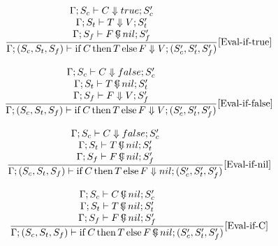 \documentclass{scrartcl}
\DeclareMathOperator{\ifop}{if}
\DeclareMathOperator{\thenop}{then}
\DeclareMathOperator{\elseop}{else}
\DeclareMathOperator{\ceval}{\overset{C}{\smash{\Downarrow}}}
\begin{document}
    \begin{align*}
    \frac{
        \begin{matrix}
        \Gamma; S_c \vdash C \Downarrow true; S_c' \\
        \Gamma; S_t \vdash T \Downarrow V; S_t' \\
        \Gamma; S_f \vdash F \ceval nil; S_f'
        \end{matrix}
    }{
        \Gamma; (S_c, S_t, S_f) \vdash \ifop C \thenop T \elseop F \Downarrow V; (S_c', S_t', S_f')
    }[\text{Eval-if-true}]
    \end{align*}
    
    \begin{align*}
    \frac{
        \begin{matrix}
        \Gamma; S_c \vdash C \Downarrow false; S_c' \\
        \Gamma; S_t \vdash T \ceval nil; S_t' \\
        \Gamma; S_f \vdash F \Downarrow V; S_f'
        \end{matrix}
    }{
        \Gamma; (S_c, S_t, S_f) \vdash \ifop C \thenop T \elseop F \Downarrow V; (S_c', S_t', S_f')
    }[\text{Eval-if-false}]
    \end{align*}
    
    \begin{align*}
    \frac{
        \begin{matrix}
        \Gamma; S_c \vdash C \Downarrow false; S_c' \\
        \Gamma; S_t \vdash T \ceval nil; S_t' \\
        \Gamma; S_f \vdash F \ceval nil; S_f'
        \end{matrix}
    }{
        \Gamma; (S_c, S_t, S_f) \vdash \ifop C \thenop T \elseop F \Downarrow nil; (S_c', S_t', S_f')
    }[\text{Eval-if-nil}]
    \end{align*}
    
    \begin{align*}
    \frac{
        \begin{matrix}
        \Gamma; S_c \vdash C \ceval nil; S_c' \\
        \Gamma; S_t \vdash T \ceval nil; S_t' \\
        \Gamma; S_f \vdash F \ceval nil; S_f'
        \end{matrix}
    }{
        \Gamma; (S_c, S_t, S_f) \vdash \ifop C \thenop T \elseop F \ceval nil; (S_c', S_t', S_f')
    }[\text{Eval-if-C}]
    \end{align*}
    
\end{document}

